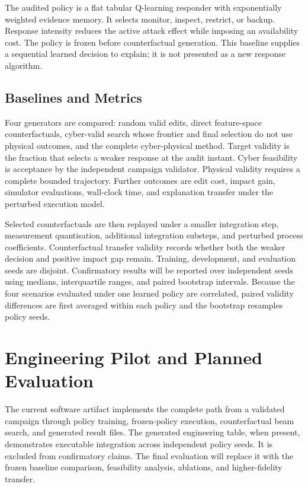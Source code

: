 \documentclass[conference]{IEEEtran}
\begin{document}
The audited policy is a flat tabular Q-learning responder with exponentially
weighted evidence memory. It selects monitor, inspect, restrict, or backup.
Response intensity reduces the active attack effect while imposing an
availability cost. The policy is frozen before counterfactual generation. This
baseline supplies a sequential learned decision to explain; it is not presented
as a new response algorithm.

\subsection{Baselines and Metrics}

Four generators are compared: random valid edits, direct feature-space
counterfactuals, cyber-valid search whose frontier and final selection do not
use physical outcomes, and the complete cyber-physical method. Target validity is the fraction that selects a
weaker response at the audit instant. Cyber feasibility is acceptance by the
independent campaign validator. Physical validity requires a complete bounded
trajectory. Further outcomes are edit cost, impact gain, simulator evaluations,
wall-clock time, and explanation transfer under the perturbed execution model.

Selected counterfactuals are then replayed under a smaller integration step,
measurement quantisation, additional integration substeps, and perturbed process
coefficients. Counterfactual transfer validity records whether both the weaker
decision and positive impact gap remain. Training, development, and evaluation
seeds are disjoint. Confirmatory results will be reported over independent seeds
using medians, interquartile ranges, and paired bootstrap intervals. Because the
four scenarios evaluated under one learned policy are correlated, paired
validity differences are first averaged within each policy and the bootstrap
resamples policy seeds.


\section{Engineering Pilot and Planned Evaluation}

The current software artifact implements the complete path from a validated
campaign through policy training, frozen-policy execution, counterfactual beam
search, and generated result files. The generated engineering table, when
present, demonstrates executable integration across independent policy seeds.
It is excluded from confirmatory claims. The final evaluation will replace it
with the frozen baseline comparison, feasibility analysis, ablations, and
higher-fidelity transfer.
\end{document}

